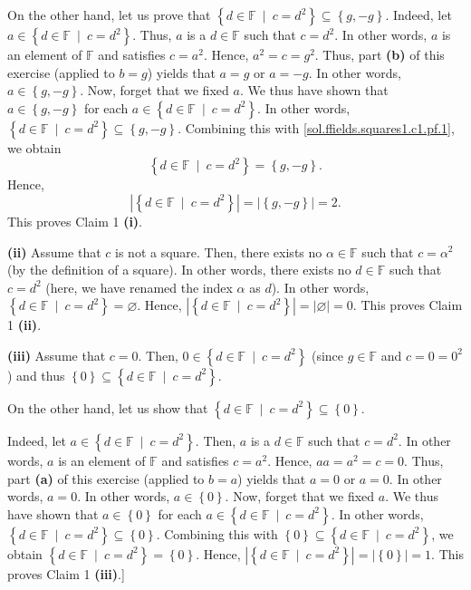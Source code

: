 \documentclass[paper=a4, fontsize=12pt]{scrartcl}%
\theoremstyle{plainsl}
\theoremstyle{definition}
\theoremstyle{remark}
\begin{document}
On the other hand, let us prove that $\left\{  d\in\mathbb{F}\ \mid
\ c=d^{2}\right\}  \subseteq\left\{  g,-g\right\}  $. Indeed, let
$a\in\left\{  d\in\mathbb{F}\ \mid\ c=d^{2}\right\}  $. Thus, $a$ is a
$d\in\mathbb{F}$ such that $c=d^{2}$. In other words, $a$ is an element of
$\mathbb{F}$ and satisfies $c=a^{2}$. Hence, $a^{2}=c=g^{2}$. Thus, part
\textbf{(b)} of this exercise (applied to $b=g$) yields that $a=g$ or $a=-g$.
In other words, $a\in\left\{  g,-g\right\}  $. Now, forget that we fixed $a$.
We thus have shown that $a\in\left\{  g,-g\right\}  $ for each $a\in\left\{
d\in\mathbb{F}\ \mid\ c=d^{2}\right\}  $. In other words, $\left\{
d\in\mathbb{F}\ \mid\ c=d^{2}\right\}  \subseteq\left\{  g,-g\right\}  $.
Combining this with \eqref{sol.ffields.squares1.c1.pf.1}, we obtain%
\[
\left\{  d\in\mathbb{F}\ \mid\ c=d^{2}\right\}  =\left\{  g,-g\right\}  .
\]
Hence,%
\[
\left\vert \left\{  d\in\mathbb{F}\ \mid\ c=d^{2}\right\}  \right\vert
=\left\vert \left\{  g,-g\right\}  \right\vert =2.
\]
This proves Claim 1 \textbf{(i)}.

\textbf{(ii)} Assume that $c$ is not a square. Then, there exists no
$\alpha\in\mathbb{F}$ such that $c=\alpha^{2}$ (by the definition of a
square). In other words, there exists no $d\in\mathbb{F}$ such that $c=d^{2}$
(here, we have renamed the index $\alpha$ as $d$). In other words, $\left\{
d\in\mathbb{F}\ \mid\ c=d^{2}\right\}  =\varnothing$. Hence, $\left\vert
\left\{  d\in\mathbb{F}\ \mid\ c=d^{2}\right\}  \right\vert =\left\vert
\varnothing\right\vert =0$. This proves Claim 1 \textbf{(ii)}.

\textbf{(iii)} Assume that $c=0$. Then, $0\in\left\{  d\in\mathbb{F}%
\ \mid\ c=d^{2}\right\}  $ (since $g\in\mathbb{F}$ and $c=0=0^{2}$) and thus
$\left\{  0\right\}  \subseteq\left\{  d\in\mathbb{F}\ \mid\ c=d^{2}\right\}
$.

On the other hand, let us show that $\left\{  d\in\mathbb{F}\ \mid
\ c=d^{2}\right\}  \subseteq\left\{  0\right\}  $.

Indeed, let $a\in\left\{  d\in\mathbb{F}\ \mid\ c=d^{2}\right\}  $. Then, $a$
is a $d\in\mathbb{F}$ such that $c=d^{2}$. In other words, $a$ is an element
of $\mathbb{F}$ and satisfies $c=a^{2}$. Hence, $aa=a^{2}=c=0$. Thus, part
\textbf{(a)} of this exercise (applied to $b=a$) yields that $a=0$ or $a=0$.
In other words, $a=0$. In other words, $a\in\left\{  0\right\}  $. Now, forget
that we fixed $a$. We thus have shown that $a\in\left\{  0\right\}  $ for each
$a\in\left\{  d\in\mathbb{F}\ \mid\ c=d^{2}\right\}  $. In other words,
$\left\{  d\in\mathbb{F}\ \mid\ c=d^{2}\right\}  \subseteq\left\{  0\right\}
$. Combining this with $\left\{  0\right\}  \subseteq\left\{  d\in
\mathbb{F}\ \mid\ c=d^{2}\right\}  $, we obtain $\left\{  d\in\mathbb{F}%
\ \mid\ c=d^{2}\right\}  =\left\{  0\right\}  $. Hence, $\left\vert \left\{
d\in\mathbb{F}\ \mid\ c=d^{2}\right\}  \right\vert =\left\vert \left\{
0\right\}  \right\vert =1$. This proves Claim 1 \textbf{(iii)}.]
\end{document}
